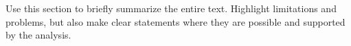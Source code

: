 Use this section to briefly summarize the entire text. Highlight limitations and problems, but also make clear statements where they are possible and supported by the analysis. 